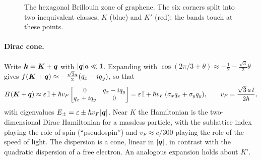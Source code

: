 \begin{figure}[ht]
\centering
{}
\caption{The hexagonal Brillouin zone of graphene. The six corners split into two inequivalent classes, $K$ (blue) and $K'$ (red); the bands touch at these points.}
\label{fig:graphene-bz}
\end{figure}

\paragraph{Dirac cone.} Write $\bm{k}=\bm{K}+\bm{q}$ with $|\bm{q}|a\ll1$. Expanding with $\cos(2\pi/3+\theta)\approx-\tfrac12-\tfrac{\sqrt3}{2}\theta$ gives $f(\bm{K}+\bm{q}) \approx -\tfrac{\sqrt3 a}{2}(q_x - i q_y)$, so that
\begin{equation}
    H(\bm{K}+\bm{q}) \approx \varepsilon\,\mathbb{I} + \hbar v_F
    \begin{bmatrix} 0 & q_x - i q_y \\ q_x + i q_y & 0 \end{bmatrix}
    = \varepsilon\,\mathbb{I} + \hbar v_F\,(\sigma_x q_x + \sigma_y q_y),
    \qquad
    v_F = \frac{\sqrt3\, a\, t}{2\hbar},
\end{equation}
with eigenvalues $E_\pm = \varepsilon \pm \hbar v_F|\bm{q}|$. Near $K$ the Hamiltonian is the two-dimensional Dirac Hamiltonian for a massless particle, with the sublattice index playing the role of spin (``pseudospin'') and $v_F\approx c/300$ playing the role of the speed of light. The dispersion is a cone, linear in $|\bm{q}|$, in contrast with the quadratic dispersion of a free electron. An analogous expansion holds about $K'$.

